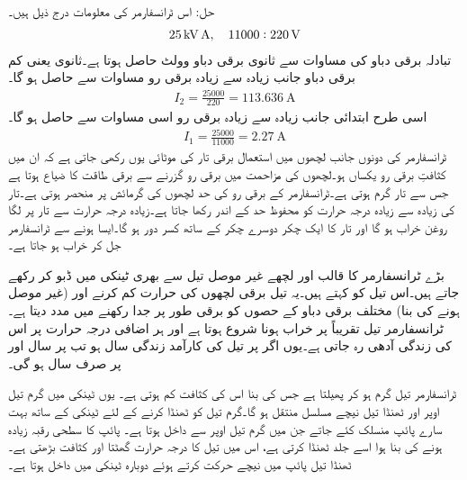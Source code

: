 حل:	اس ٹرانسفارمر کی معلومات درج ذیل ہیں۔
\begin{align*}
\SI{25}{\kilo \volt \ampere}, \quad 11000:220\,\textup{V}
\end{align*}
تبادلہ برقی دباو کی مساوات سے  ثانوی  برقی دباو    وولٹ حاصل ہوتا ہے۔ثانوی  یعنی کم برقی دباو  جانب زیادہ سے زیادہ برقی رو مساوات   سے حاصل ہو گا۔
\begin{align*}
I_2=\frac{25000}{220}=\SI{113.636}{\ampere}
\end{align*}
اسی طرح  ابتدائی جانب زیادہ سے زیادہ برقی رو اسی مساوات سے حاصل ہو گا۔
\begin{align*}
I_1=\frac{25000}{11000}=\SI{2.27}{\ampere}
\end{align*}
%
ٹرانسفارمر کی دونوں جانب لچھوں میں استعمال برقی تار کی موٹائی یوں رکھی جاتی ہے کہ ان میں کثافتِ برقی رو  یکساں ہو۔لچھوں کی مزاحمت میں برقی رو گزرنے سے برقی طاقت کا ضیاع ہوتا ہے جس سے تار گرم ہوتی ہے۔ٹرانسفارمر کے برقی رو کی حد لچھوں کی گرمائش پر منحصر ہوتی ہے۔تار کی زیادہ سے زیادہ درجہ حرارت کو محفوظ حد کے اندر رکھا جاتا ہے۔زیادہ درجہ حرارت سے تار پر لگا روغن خراب ہو گا اور تار کا ایک چکر دوسرے چکر کے ساتھ کسر دور ہو گا۔ایسا ہونے سے ٹرانسفارمر جل کر خراب ہو جاتا ہے۔ 

بڑے ٹرانسفارمر کا قالب اور لچھے  غیر موصل تیل سے بھری ٹینکی میں ڈبو کر رکھے جاتے ہیں۔اس تیل کو  کہتے ہیں۔یہ تیل برقی لچھوں کی حرارت کم کرنے  اور   (غیر موصل ہونے کی بنا) مختلف برقی دباو کے حصوں کو برقی طور پر جدا رکھنے میں مدد دیتا ہے۔ٹرانسفارمر تیل تقریباً   پر خراب ہونا شروع ہوتا ہے اور ہر  اضافی درجہ حرارت پر اس کی زندگی آدھی رہ جاتی ہے۔یوں اگر  پر تیل کی کارآمد زندگی  سال ہو تب  پر  سال اور   پر  صرف   سال ہو گی۔

ٹرانسفارمر  تیل گرم ہو کر پھیلتا ہے جس کی بنا اس کی کثافت کم ہوتی ہے۔ یوں  ٹینکی میں گرم تیل اوپر اور ٹھنڈا تیل نیچے مسلسل منتقل ہو گا۔گرم تیل کو ٹھنڈا کرنے کے لئے ٹینکی کے ساتھ بہت سارے پائپ منسلک کئے جاتے جن میں  گرم تیل  اوپر سے  داخل ہوتا ہے۔ پائپ کا سطحی رقبہ زیادہ ہونے کی بنا ہوا اسے جلد ٹھنڈا کرتی ہے،  اس میں تیل کا درجہ حرارت گھٹتا اور  کثافت بڑھتی ہے۔ٹھنڈا تیل پائپ میں نیچے حرکت کرتے ہوئے دوبارہ ٹینکی میں داخل ہوتا ہے۔

